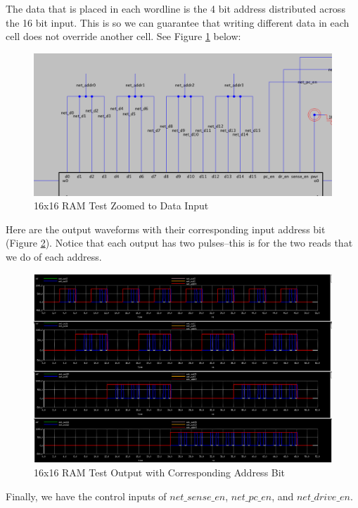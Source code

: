 \documentclass[a4paper]{article}
\begin{document}
The data that is placed in each wordline is the 4 bit address distributed across the 16 bit input. This is so we can guarantee that writing different data in each cell does not override another cell. See Figure \ref{fig:memory16x16TestSchematicDataLines} below:

\begin{figure}[H]
	\centering
	\includegraphics[scale=0.3]{memory16x16TestSchematicDataLines}
	\caption{16x16 RAM Test Zoomed to Data Input}
	\label{fig:memory16x16TestSchematicDataLines}
\end{figure}

Here are the output waveforms with their corresponding input address bit (Figure \ref{fig:memory16x16TestWaveformOutputCorrectness}). Notice that each output has two pulses--this is for the two reads that we do of each address. 

\begin{figure}[H]
	\centering
	\includegraphics[scale=0.2]{memory16x16TestWaveformOutputCorrectness}
	\caption{16x16 RAM Test Output with Corresponding Address Bit}
	\label{fig:memory16x16TestWaveformOutputCorrectness}
\end{figure}
\newpage
Finally, we have the control inputs of $net\_sense\_en$, $net\_pc\_en$, and $net\_drive\_en$.
\end{document}
